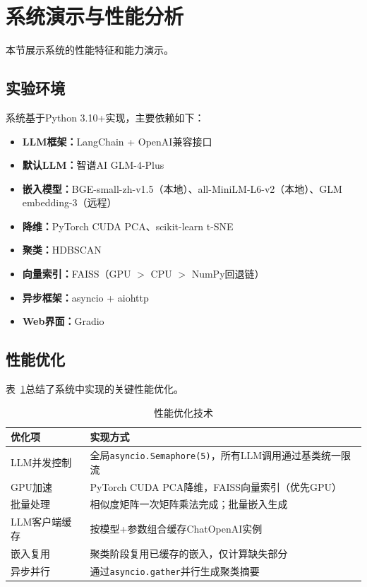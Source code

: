 \section{系统演示与性能分析}
\label{sec:exp}

本节展示系统的性能特征和能力演示。

\subsection{实验环境}

系统基于Python 3.10+实现，主要依赖如下：
\begin{itemize}
    \item \textbf{LLM框架：}LangChain + OpenAI兼容接口
    \item \textbf{默认LLM：}智谱AI GLM-4-Plus
    \item \textbf{嵌入模型：}BGE-small-zh-v1.5（本地）、all-MiniLM-L6-v2（本地）、GLM embedding-3（远程）
    \item \textbf{降维：}PyTorch CUDA PCA、scikit-learn t-SNE
    \item \textbf{聚类：}HDBSCAN
    \item \textbf{向量索引：}FAISS（GPU $>$ CPU $>$ NumPy回退链）
    \item \textbf{异步框架：}asyncio + aiohttp
    \item \textbf{Web界面：}Gradio
\end{itemize}

\subsection{性能优化}

表~\ref{tbl:optimizations}总结了系统中实现的关键性能优化。

\begin{table}[htbp]
    \centering
    \caption{性能优化技术}
    \label{tbl:optimizations}
    \begin{tabular}{lp{7cm}}
    \toprule
    优化项 & 实现方式 \\
    \midrule
    LLM并发控制 & 全局\texttt{asyncio.Semaphore(5)}，所有LLM调用通过基类统一限流 \\
    GPU加速 & PyTorch CUDA PCA降维，FAISS向量索引（优先GPU） \\
    批量处理 & 相似度矩阵一次矩阵乘法完成；批量嵌入生成 \\
    LLM客户端缓存 & 按模型+参数组合缓存ChatOpenAI实例 \\
    嵌入复用 & 聚类阶段复用已缓存的嵌入，仅计算缺失部分 \\
    异步并行 & 通过\texttt{asyncio.gather}并行生成聚类摘要 \\
    \bottomrule
    \end{tabular}
\end{table}

